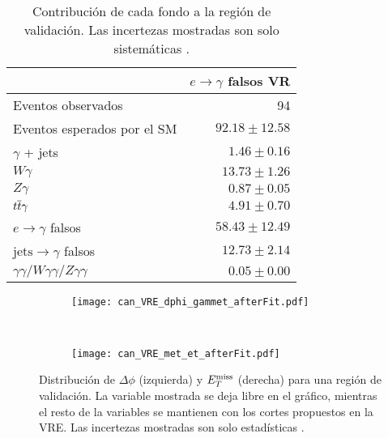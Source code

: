 \begin{table}
\centering
\caption{Contribución de cada fondo a la región de validación. Las incertezas mostradas son solo sistemáticas \cite{drfran}.}
\begin{tabular}{lr}
\hline
 & $e\to\gamma$ falsos VR \\
\hline
Eventos observados & 94 \\
\hline
Eventos esperados por el SM & $92.18 \pm 12.58$ \\
\hline
$\gamma$ + jets & $1.46 \pm 0.16$ \\
$W\gamma$ & $13.73 \pm 1.26$ \\
$Z\gamma$ & $0.87 \pm 0.05$ \\
$t \overline{t}\gamma$ & $4.91 \pm 0.70$ \\
$e\rightarrow\gamma$ falsos & $58.43 \pm 12.49$ \\
$\text{jets}\rightarrow\gamma$ falsos & $12.73 \pm 2.14$ \\
$\gamma\gamma / W\gamma\gamma / Z\gamma\gamma$ & $0.05 \pm 0.00$ \\
\hline
\end{tabular}
\label{ta:vr_events}
\end{table}


\begin{figure}
\centering
	\begin{subfigure}{0.45\textwidth}
		\texttt{[image: can\_VRE\_dphi\_gammet\_afterFit.pdf]}
	\end{subfigure}
	~
	\begin{subfigure}{0.45\textwidth}
		\texttt{[image: can\_VRE\_met\_et\_afterFit.pdf]}
	\end{subfigure}
\caption{Distribución de $\Delta \phi$ (izquierda) y  $E_{T}^{\text{miss}}$ (derecha) para una región de validación. La variable mostrada se deja libre en el gráfico, mientras el resto de la variables se mantienen con los cortes propuestos en la VRE. Las incertezas mostradas son solo estadísticas \cite{drfran}.}
\label{VRE_dphi_met}
\end{figure}




\clearpage